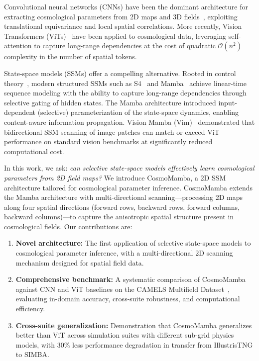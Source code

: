 \documentclass[twocolumn,showpacs,preprintnumbers,amsmath,amssymb,aps,prd]{revtex4-2}
\begin{document}
Convolutional neural networks (CNNs) have been the dominant architecture for extracting
cosmological parameters from 2D maps and 3D
fields~\cite{ravanbakhsh2017,villaescusa2022cmd}, exploiting translational equivariance
and local spatial correlations. More recently, Vision Transformers
(ViTs)~\cite{dosovitskiy2021vit} have been applied to cosmological data, leveraging
self-attention to capture long-range dependencies at the cost of quadratic $\mathcal{O}(n^2)$
complexity in the number of spatial tokens.

State-space models (SSMs) offer a compelling alternative. Rooted in control
theory~\cite{kalman1960}, modern structured SSMs such as S4~\cite{gu2022s4} and
Mamba~\cite{gu2023mamba} achieve linear-time sequence modeling with the ability to capture
long-range dependencies through selective gating of hidden states. The Mamba architecture
introduced input-dependent (selective) parameterization of the state-space dynamics,
enabling content-aware information propagation. Vision Mamba (Vim)~\cite{zhu2024vim}
demonstrated that bidirectional SSM scanning of image patches can match or exceed ViT
performance on standard vision benchmarks at significantly reduced computational cost.

In this work, we ask: \emph{can selective state-space models effectively learn cosmological
parameters from 2D field maps?} We introduce CosmoMamba, a 2D SSM architecture tailored
for cosmological parameter inference. CosmoMamba extends the Mamba architecture with
multi-directional scanning---processing 2D maps along four spatial directions (forward
rows, backward rows, forward columns, backward columns)---to capture the anisotropic
spatial structure present in cosmological fields. Our contributions are:

\begin{enumerate}
    \item \textbf{Novel architecture:} The first application of selective state-space
    models to cosmological parameter inference, with a multi-directional 2D scanning
    mechanism designed for spatial field data.

    \item \textbf{Comprehensive benchmark:} A systematic comparison of CosmoMamba against
    CNN and ViT baselines on the CAMELS Multifield Dataset~\cite{villaescusa2022cmd},
    evaluating in-domain accuracy, cross-suite robustness, and computational efficiency.

    \item \textbf{Cross-suite generalization:} Demonstration that CosmoMamba generalizes
    better than ViT across simulation suites with different sub-grid physics models, with
    $30\%$ less performance degradation in transfer from IllustrisTNG to SIMBA.
\end{enumerate}
\end{document}
